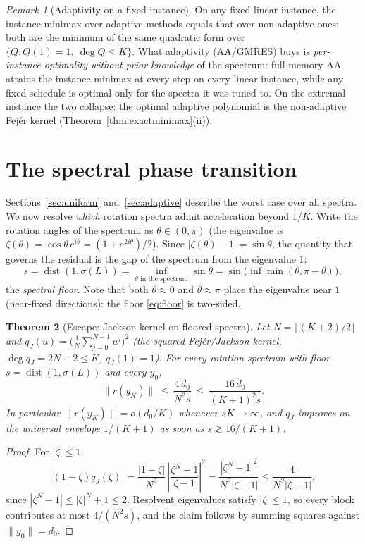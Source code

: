 \documentclass[11pt]{article}
\newtheorem{theorem}{Theorem}[section]
\theoremstyle{definition}
\theoremstyle{remark}
\newtheorem{remark}[theorem]{Remark}
\DeclareMathOperator{\dist}{dist}
\newcommand{\norm}[1]{\| #1 \|}
\newcommand{\abs}[1]{| #1 |}
\begin{document}
\begin{remark}[Adaptivity on a fixed instance]\label{rem:fixedinstance}
On any fixed linear instance, the instance minimax over adaptive methods
equals that over non-adaptive ones: both are the minimum of the same
quadratic form over $\{Q:Q(1)=1,\ \deg Q\le K\}$. What adaptivity
(AA/GMRES) buys is \emph{per-instance optimality without prior knowledge}
of the spectrum: full-memory AA attains the instance minimax at every step
on every linear instance, while any fixed schedule is optimal only for the
spectra it was tuned to. On the extremal instance the two collapse: the
optimal adaptive polynomial is the non-adaptive Fej\'er kernel
(Theorem~\ref{thm:exactminimax}(ii)).
\end{remark}

\section{The spectral phase transition}\label{sec:phase}

Sections~\ref{sec:uniform} and~\ref{sec:adaptive} describe the worst case
over all spectra. We now resolve \emph{which} rotation spectra admit
acceleration beyond $1/K$. Write the rotation angles of the spectrum as
$\theta\in(0,\pi)$ (the eigenvalue is
$\zeta(\theta)=\cos\theta\,e^{i\theta}=(1+e^{2i\theta})/2$). Since
$\abs{\zeta(\theta)-1}=\sin\theta$, the quantity that governs the residual
is the gap of the spectrum from the eigenvalue $1$:
\begin{equation}\label{eq:floor}
s=\dist(1,\sigma(L))
=\inf_{\theta\text{ in the spectrum}}\sin\theta
=\sin\big(\inf\min(\theta,\pi-\theta)\big),
\end{equation}
the \emph{spectral floor}. Note that both $\theta\approx0$ and
$\theta\approx\pi$ place the eigenvalue near $1$ (near-fixed directions):
the floor \eqref{eq:floor} is two-sided.

\begin{theorem}[Escape: Jackson kernel on floored spectra]\label{thm:jackson}
Let $N=\lfloor(K+2)/2\rfloor$ and
$q_J(u)=\big(\frac1N\sum_{j=0}^{N-1}u^j\big)^2$ (the squared
Fej\'er/Jackson kernel, $\deg q_J=2N-2\le K$, $q_J(1)=1$). For every
rotation spectrum with floor $s=\dist(1,\sigma(L))$ and every $y_0$,
\begin{equation}\label{eq:jackson}
\norm{r(y_K)}\ \le\ \frac{4\,d_0}{N^2 s}
\ \le\ \frac{16\,d_0}{(K+1)^2 s}.
\end{equation}
In particular $\norm{r(y_K)}=o(d_0/K)$ whenever $sK\to\infty$, and
$q_J$ improves on the universal envelope $1/(K+1)$ as soon as
$s\gtrsim 16/(K+1)$.
\end{theorem}
\begin{proof}
For $\abs{\zeta}\le1$,
\[
\abs{(1-\zeta)q_J(\zeta)}
=\frac{\abs{1-\zeta}}{N^2}\,\abs{\frac{\zeta^N-1}{\zeta-1}}^2
=\frac{\abs{\zeta^N-1}^2}{N^2\abs{\zeta-1}}
\le \frac{4}{N^2\abs{\zeta-1}},
\]
since $\abs{\zeta^N-1}\le\abs{\zeta}^N+1\le2$. Resolvent eigenvalues satisfy
$\abs{\zeta}\le1$, so every block contributes at most $4/(N^2 s)$, and the
claim follows by summing squares against $\norm{y_0}=d_0$.
\end{proof}
\end{document}
